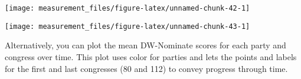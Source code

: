 \documentclass[]{book}
\newenvironment{Shaded}{\begin{snugshade}}{\end{snugshade}}
\newcommand{\DataTypeTok}[1]{\textcolor[rgb]{0.13,0.29,0.53}{#1}}
\newcommand{\KeywordTok}[1]{\textcolor[rgb]{0.13,0.29,0.53}{\textbf{#1}}}
\newcommand{\NormalTok}[1]{#1}
\newcommand{\OperatorTok}[1]{\textcolor[rgb]{0.81,0.36,0.00}{\textbf{#1}}}
\newcommand{\StringTok}[1]{\textcolor[rgb]{0.31,0.60,0.02}{#1}}
\theoremstyle{definition}
\theoremstyle{definition}
\theoremstyle{definition}
\theoremstyle{remark}
\begin{document}
\begin{center}\texttt{[image: measurement\_files/figure-latex/unnamed-chunk-42-1]} \end{center}

\begin{Shaded}
\end{Shaded}

\begin{center}\texttt{[image: measurement\_files/figure-latex/unnamed-chunk-43-1]} \end{center}

Alternatively, you can plot the mean DW-Nominate scores for each party
and congress over time. This plot uses color for parties and lets the
points and labels for the first and last congresses (80 and 112) to
convey progress through time.
\end{document}
